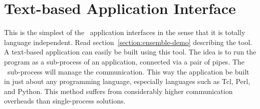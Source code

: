 %
%
%
\section{Text-based Application Interface}

This is the simplest of the \ensemble\ application interfaces in the
sense that it is totally language independent.  Read
section~\ref{section:ensemble-demo} describing the
 tool.  A text-based application can easily be
built using this tool.  The idea is to run the 
program as a sub-process of an application, connected via a pair of
pipes.  The \ensemble\ sub-process will manage the communication.
This way the application be built in just about any programming
language, especially languages such as Tcl, Perl, and Python.  This
method suffers from considerably higher communication overheads than
single-process solutions.
